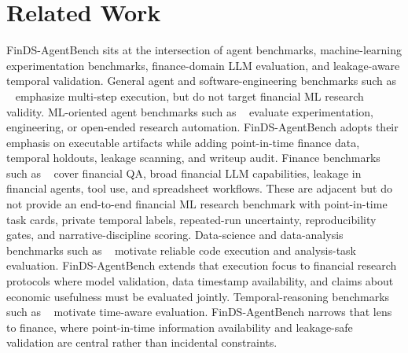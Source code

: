 \section{Related Work}
FinDS-AgentBench sits at the intersection of agent benchmarks, machine-learning experimentation benchmarks, finance-domain LLM evaluation, and leakage-aware temporal validation. General agent and software-engineering benchmarks such as ~\cite{agentbench2023,swebench2023} emphasize multi-step execution, but do not target financial ML research validity.
ML-oriented agent benchmarks such as ~\cite{mlagentbench2023,mlebench2024,scienceagentbench2024,mlrbench2025} evaluate experimentation, engineering, or open-ended research automation. FinDS-AgentBench adopts their emphasis on executable artifacts while adding point-in-time finance data, temporal holdouts, leakage scanning, and writeup audit.
Finance benchmarks such as ~\cite{financebench2023,finben2024,profitmirage2025,fintoolbench2026,finmcpbench2026,workstreambench2026,bluefin2026} cover financial QA, broad financial LLM capabilities, leakage in financial agents, tool use, and spreadsheet workflows. These are adjacent but do not provide an end-to-end financial ML research benchmark with point-in-time task cards, private temporal labels, repeated-run uncertainty, reproducibility gates, and narrative-discipline scoring.
Data-science and data-analysis benchmarks such as ~\cite{ds10002022,infiagentdabench2024} motivate reliable code execution and analysis-task evaluation. FinDS-AgentBench extends that execution focus to financial research protocols where model validation, data timestamp availability, and claims about economic usefulness must be evaluated jointly.
Temporal-reasoning benchmarks such as ~\cite{temporalbench2026} motivate time-aware evaluation. FinDS-AgentBench narrows that lens to finance, where point-in-time information availability and leakage-safe validation are central rather than incidental constraints.

